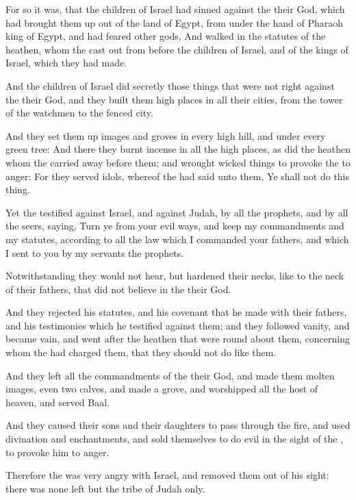 \verse For so it was, that the children of Israel had sinned against the \LORD their God, which had brought them up out of the land of Egypt, from under the hand of Pharaoh king of Egypt, and had feared other gods, \verse And walked in the statutes of the heathen, whom the \LORD cast out from before the children of Israel, and of the kings of Israel, which they had made.

\verse And the children of Israel did secretly those things that were not right against the \LORD their God, and they built them high places in all their cities, from the tower of the watchmen to the fenced city.

\verse And they set them up images and groves in every high hill, and under every green tree: \verse And there they burnt incense in all the high places, as did the heathen whom the \LORD carried away before them; and wrought wicked things to provoke the \LORD to anger: \verse For they served idols, whereof the \LORD had said unto them, Ye shall not do this thing.

\verse Yet the \LORD testified against Israel, and against Judah, by all the prophets, and by all the seers, saying, Turn ye from your evil ways, and keep my commandments and my statutes, according to all the law which I commanded your fathers, and which I sent to you by my servants the prophets.

\verse Notwithstanding they would not hear, but hardened their necks, like to the neck of their fathers, that did not believe in the \LORD their God.

\verse And they rejected his statutes, and his covenant that he made with their fathers, and his testimonies which he testified against them; and they followed vanity, and became vain, and went after the heathen that were round about them, concerning whom the \LORD had charged them, that they should not do like them.

\verse And they left all the commandments of the \LORD their God, and made them molten images, even two calves, and made a grove, and worshipped all the host of heaven, and served Baal.

\verse And they caused their sons and their daughters to pass through the fire, and used divination and enchantments, and sold themselves to do evil in the sight of the \LORD, to provoke him to anger.

\verse Therefore the \LORD was very angry with Israel, and removed them out of his sight: there was none left but the tribe of Judah only.

